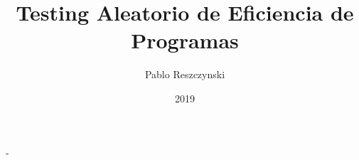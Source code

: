 \documentclass[spanish]{lipics-v2019}
\title{Testing Aleatorio de Eficiencia de Programas}
\author{Pablo Reszczynski}
{Universidad de Chile}
{pablo.reszczynski@dcc.uchile.cl}
{}{}
\date{2019}
\def\inputtex#1{}
\begin{document}
\inputtex{sec-introduction.tex}
\inputtex{sec-problem.tex}
\inputtex{sec-sta.tex}
\inputtex{sec-objectives.tex}
\inputtex{sec-workplan.tex}
\inputtex{sec-solution.tex}
-
{}
\end{document}
